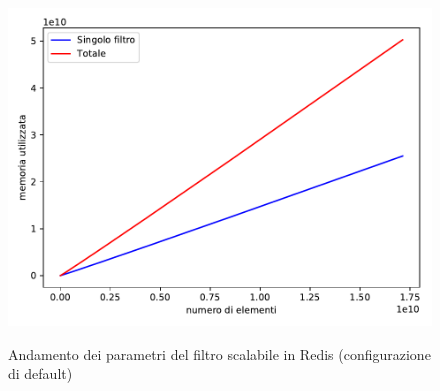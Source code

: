 \begin{figure}
\begin{minipage}[c]{0.7\textwidth}
{      \includegraphics[width=\textwidth]{img/scalingbloom_memory}
    }
  \end{minipage}

  \caption{Andamento dei parametri del filtro scalabile in Redis (configurazione di default)}
  \label{fig:scalingbloom}
\end{figure}
















